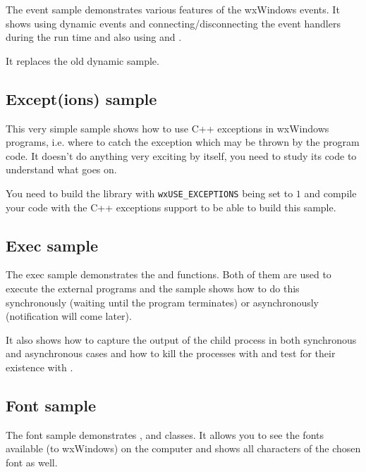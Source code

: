 The event sample demonstrates various features of the wxWindows events. It
shows using dynamic events and connecting/disconnecting the event handlers
during the run time and also using 
 and
.

It replaces the old dynamic sample.


\subsection{Except(ions) sample}\label{sampleexcept}

This very simple sample shows how to use C++ exceptions in wxWindows programs,
i.e. where to catch the exception which may be thrown by the program code. It
doesn't do anything very exciting by itself, you need to study its code to
understand what goes on.

You need to build the library with \texttt{wxUSE\_EXCEPTIONS} being set to $1$
and compile your code with the C++ exceptions support to be able to build this
sample.


\subsection{Exec sample}\label{sampleexec}

The exec sample demonstrates the  and 
 functions. Both of them are used to execute the
external programs and the sample shows how to do this synchronously (waiting
until the program terminates) or asynchronously (notification will come later).

It also shows how to capture the output of the child process in both
synchronous and asynchronous cases and how to kill the processes with 
 and test for their existence with 
.


\subsection{Font sample}\label{samplefont}

The font sample demonstrates , 
 and 
 classes. It allows you to see the fonts
available (to wxWindows) on the computer and shows all characters of the
chosen font as well.



